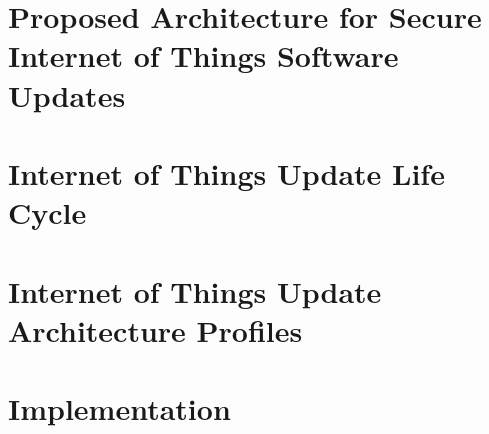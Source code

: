 \documentclass[0-thesis.tex]{subfiles}
\begin{document}
    \section{Proposed Architecture for Secure Internet of Things Software Updates}
    

    \section{Internet of Things Update Life Cycle}
    

    \section{Internet of Things Update Architecture Profiles}
    

    \section{Implementation}
    
\end{document}
